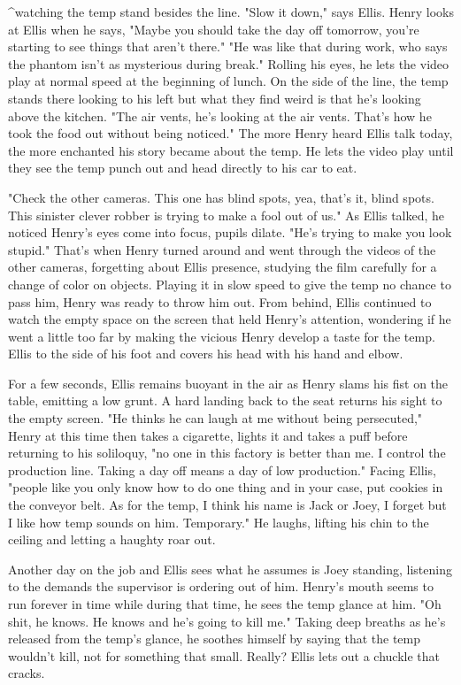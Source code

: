 \begin{Document}
                                  ^watching the temp stand besides the line.
        "Slow it down," says Ellis. Henry looks at Ellis when he says, "Maybe you should take the day off tomorrow, you're starting to see things that aren't
    there." "He was like that during work, who says the phantom isn't as mysterious during break." Rolling his eyes, he lets the video play at normal speed at
    the beginning of lunch. On the side of the line, the temp stands there looking to his left but what they find weird is that he's looking above the kitchen.
    "The air vents, he's looking at the air vents. That's how he took the food out without being noticed." The more Henry heard Ellis talk today, the more
    enchanted his story became about the temp. He lets the video play until they see the temp punch out and head directly to his car to eat.

        "Check the other cameras. This one has blind spots, yea, that's it, blind spots. This sinister clever robber is trying to make a fool out of us." As Ellis
    talked, he noticed Henry's eyes come into focus, pupils dilate. "He's trying to make you look stupid." That's when Henry turned around and went through the
    videos of the other cameras, forgetting about Ellis presence, studying the film carefully for a change of color on objects. Playing it in slow speed to give
    the temp no chance to pass him, Henry was ready to throw him out. From behind, Ellis continued to watch the empty space on the screen that held Henry's 
    attention, wondering if he went a little too far by making the vicious Henry develop a taste for the temp. Ellis to the side of his foot and covers his head
    with his hand and elbow.

        For a few seconds, Ellis remains buoyant in the air as Henry slams his fist on the table, emitting a low grunt. A hard landing back to the seat returns
    his sight to the empty screen. "He thinks he can laugh at me without being persecuted," Henry at this time then takes a cigarette, lights it and takes a
    puff before returning to his soliloquy, "no one in this factory is better than me. I control the production line. Taking a day off means a day of low
    production." Facing Ellis, "people like you only know how to do one thing and in your case, put cookies in the conveyor belt. As for the temp, I think his
    name is Jack or Joey, I forget but I like how temp sounds on him. Temporary." He laughs, lifting his chin to the ceiling and letting a haughty roar out.

       Another day on the job and Ellis sees what he assumes is Joey standing, listening to the demands the supervisor is ordering out of him. Henry's mouth seems
    to run forever in time while during that time, he sees the temp glance at him. "Oh shit, he knows. He knows and he's going to kill me." Taking deep breaths 
    as he's released from the temp's glance, he soothes himself by saying that the temp wouldn't kill, not for something that small. Really? Ellis lets out
    a chuckle that cracks.


\end{Document}
